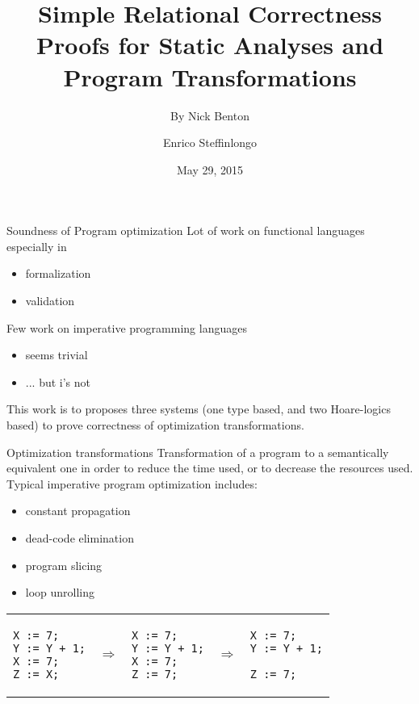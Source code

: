 \documentclass[11pt]{beamer}
\author{Enrico Steffinlongo}
\title{Simple Relational Correctness Proofs for
Static Analyses and Program Transformations}
\subtitle{By Nick Benton}
\institute{Università Ca' Foscari - Computer science}
\date{May 29, 2015}
\begin{document}
\begin{frame}
\titlepage
\end{frame}


\begin{frame}{Soundness of Program optimization}
Lot of work on functional languages especially in
\begin{itemize}
\item formalization
\item validation
\end{itemize}
Few work on imperative programming languages
\begin{itemize}
\item seems trivial
\item ... but i's not
\end{itemize}
This work is to proposes three systems (one type based, and two Hoare-logics based) to prove correctness of optimization transformations.
\end{frame}

\begin{frame}[fragile]{Optimization transformations}
Transformation of a program to a semantically equivalent one in order to reduce the time used, or to decrease the resources used.\\
Typical imperative program optimization includes:
\begin{itemize}
\item constant propagation
\item dead-code elimination
\item program slicing
\item loop unrolling
\end{itemize}
\begin{tabular}{lclcl}
\begin{lstlisting}
X := 7;
Y := Y + 1;
X := 7;
Z := X;
\end{lstlisting}&$\Rightarrow$& 
\begin{lstlisting}
X := 7;
Y := Y + 1;
X := 7;
Z := 7;
\end{lstlisting}&$\Rightarrow$&
\begin{lstlisting}
X := 7;
Y := Y + 1;

Z := 7;
\end{lstlisting}
\end{tabular}
\end{frame}
\end{document}
